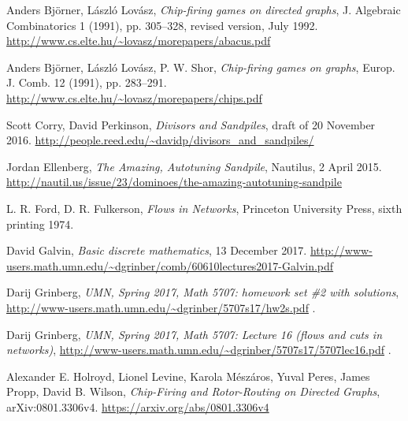 \documentclass[numbers=enddot,12pt,final,onecolumn,notitlepage]{scrartcl}%
\theoremstyle{definition}
\begin{document}
\begin{thebibliography}{99999999}

Anders Bj\"orner, L\'aszl\'o Lov\'asz,
\textit{Chip-firing games on directed graphs},
J. Algebraic Combinatorics 1 (1991), pp. 305--328,
revised version, July 1992.
\newline\url{http://www.cs.elte.hu/~lovasz/morepapers/abacus.pdf}

Anders Bj\"orner, L\'aszl\'o Lov\'asz, P. W. Shor,
\textit{Chip-firing games on graphs},
Europ. J. Comb. 12 (1991), pp. 283--291.
\newline\url{http://www.cs.elte.hu/~lovasz/morepapers/chips.pdf}

Scott Corry, David Perkinson,
\textit{Divisors and Sandpiles},
draft of 20 November 2016.
\newline\url{http://people.reed.edu/~davidp/divisors_and_sandpiles/}

Jordan Ellenberg,
\textit{The Amazing, Autotuning Sandpile},
Nautilus, 2 April 2015.
\newline\url{http://nautil.us/issue/23/dominoes/the-amazing-autotuning-sandpile}

L. R. Ford, D. R. Fulkerson,
\textit{Flows in Networks},
Princeton University Press,
sixth printing 1974.

David Galvin, \textit{Basic discrete mathematics}, 13
December 2017.\newline
\url{http://www-users.math.umn.edu/~dgrinber/comb/60610lectures2017-Galvin.pdf}

Darij Grinberg,
\textit{UMN, Spring 2017, Math 5707: homework set \#2 with solutions},
\newline\url{http://www-users.math.umn.edu/~dgrinber/5707s17/hw2s.pdf} .

Darij Grinberg,
\textit{UMN, Spring 2017, Math 5707: Lecture 16 (flows and cuts in networks)},
\newline\url{http://www-users.math.umn.edu/~dgrinber/5707s17/5707lec16.pdf} .

Alexander E. Holroyd, Lionel Levine, Karola M\'esz\'aros,
Yuval Peres, James Propp, David B. Wilson,
\textit{Chip-Firing and Rotor-Routing on Directed Graphs},
arXiv:0801.3306v4.
\newline\url{https://arxiv.org/abs/0801.3306v4}


\end{thebibliography}
\end{document}
